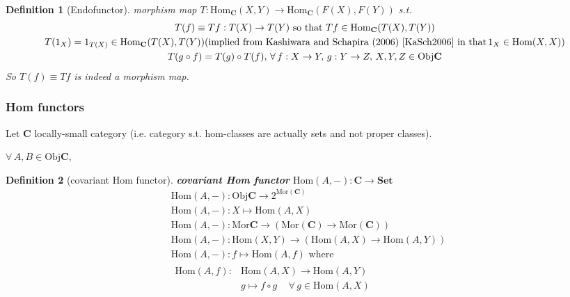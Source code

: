 \documentclass[10pt]{amsart}
\newtheorem{definition}{Definition}
\begin{document}
\begin{multicols*}{2}
\begin{definition}[Endofunctor]
	morphism map $T: \text{Hom}_{\mathbf{C}}(X, Y) \to \text{Hom}_{\mathbf{C}}(F(X), F(Y))$ s.t. 
	\begin{equation}
	\begin{gathered} 
		T(f) \equiv Tf:T(X) \to T(Y) \text{ so that } Tf \in \text{Hom}_{\mathbf{C}}(T(X), T(Y))  \\
		T(1_X) = 1_{T(X)} \in \text{Hom}_{\mathbf{C}}(T(X), T(Y)) (\text{implied from Kashiwara and Schapira (2006) \cite{KaSch2006} in that} \, 1_X \in \text{Hom}(X,X)) \\
		T(g\circ f) = T(g) \circ T(f), \, \forall \, f:X \to Y, \, g:Y \to Z, \, X,Y,Z\in \text{Obj}{\mathbf{C}}
	\end{gathered} 
	\end{equation} 
	So $T(f) \equiv Tf$ is indeed a morphism map.

\end{definition}

\subsubsection{Hom functors}

Let $\mathbf{C}$ locally-small category (i.e. category s.t. hom-classes are actually sets and not proper classes).

$\forall \, A, B \in \text{Obj}\mathbf{C}$, 

\begin{definition}[covariant Hom functor]
	\textbf{covariant Hom functor} $\text{Hom}(A, -): \mathbf{C} \to \mathbf{Set}$
	\begin{equation}
	\begin{aligned}
	& \text{Hom}(A, - ) : \text{Obj}\mathbf{C} \to  2^{\text{Mor}(\mathbf{C})} \\ 
	& \text{Hom}(A, - ) : X \mapsto \text{Hom}(A,X) \\ 
	& \text{Hom}(A, - ) : \text{Mor}\mathbf{C} \to (\text{Mor}(\mathbf{C}) \to \text{Mor}(\mathbf{C})) \\
	& \text{Hom}(A, - ) : \text{Hom}(X,Y) \to (\text{Hom}(A,X) \to \text{Hom}(A,Y)) \\
	& \text{Hom}(A, - ) : f \mapsto \text{Hom}(A,f) \text{ where } \\
	& \begin{aligned} \text{Hom}(A,f) : & \text{Hom}(A,X) \to \text{Hom}(A,Y) \\ 
	& g\mapsto f\circ g \quad \, \forall \, g \in \text{Hom}(A,X) 
	\end{aligned} 
	\end{aligned}
	\end{equation}
\end{definition}


\end{multicols*}
\end{document}
